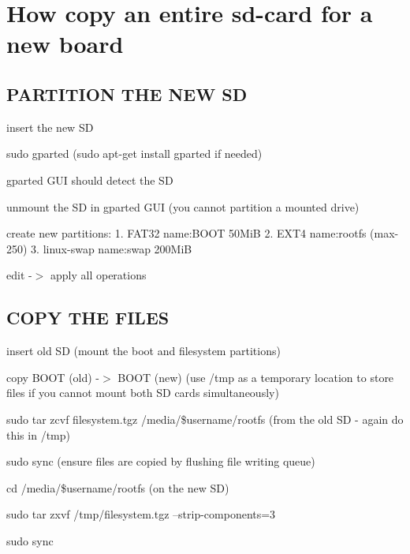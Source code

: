 \section*{How copy an entire sd-\/card for a new board}

\subsection*{P\+A\+R\+T\+I\+T\+I\+ON T\+HE N\+EW SD}


\begin{DoxyItemize}
\item insert the new SD
\item sudo gparted (sudo apt-\/get install gparted if needed)
\item gparted G\+UI should detect the SD
\item unmount the SD in gparted G\+UI (you cannot partition a mounted drive)
\item create new partitions\+: 1. F\+A\+T32 name\+:B\+O\+OT 50\+MiB 2. E\+X\+T4 name\+:rootfs (max-\/250) 3. linux-\/swap name\+:swap 200\+MiB
\item edit -\/$>$ apply all operations
\end{DoxyItemize}

\subsection*{C\+O\+PY T\+HE F\+I\+L\+ES}


\begin{DoxyItemize}
\item insert old SD (mount the boot and filesystem partitions)
\item copy B\+O\+OT (old) -\/$>$ B\+O\+OT (new) (use /tmp as a temporary location to store files if you cannot mount both SD cards simultaneously)
\item sudo tar zcvf filesystem.\+tgz /media/\$username/rootfs (from the old SD -\/ again do this in /tmp)
\item sudo sync (ensure files are copied by flushing file writing queue)
\item cd /media/\$username/rootfs (on the new SD)
\item sudo tar zxvf /tmp/filesystem.tgz --strip-\/components=3
\item sudo sync 
\end{DoxyItemize}